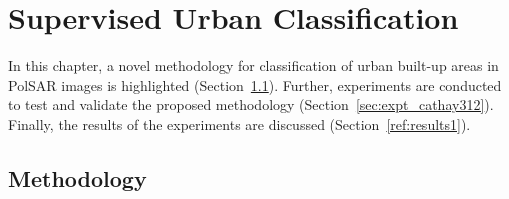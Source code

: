 \chapter{Supervised Urban Classification}

In this chapter, a novel methodology for classification of urban built-up areas in PolSAR images is highlighted (Section~\ref{sec:method_delta741}). Further, experiments are conducted to test and validate the proposed methodology (Section~\ref{sec:expt_cathay312}). Finally, the results of the experiments are discussed (Section~\ref{ref:results1}). 

\section{Methodology} 
\label{sec:method_delta741}


